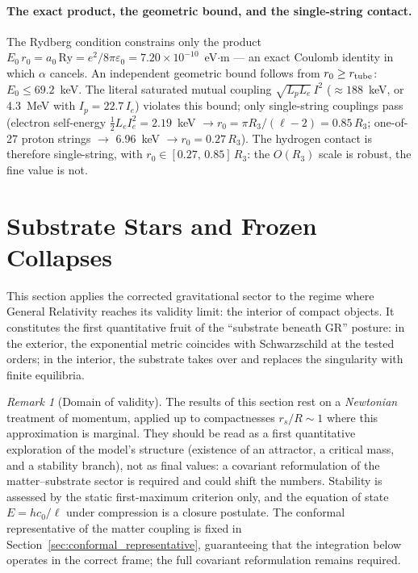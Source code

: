 \documentclass[11pt,a4paper]{article}
\theoremstyle{plain}
\theoremstyle{remark}
\newtheorem*{remarkstar}{Remark}
\begin{document}
\paragraph{The exact product, the geometric bound, and the single-string contact.} The Rydberg condition constrains only the product $E_0\,r_0 = a_0\,\mathrm{Ry} = e^2/8\pi\varepsilon_0 = 7.20\times10^{-10}$~eV$\cdot$m --- an exact Coulomb identity in which $\alpha$ cancels. An independent geometric bound follows from $r_0 \ge r_{\rm tube}$: $E_0 \le 69.2$~keV. The literal saturated mutual coupling $\sqrt{L_pL_e}\,I^2$ ($\approx 188$~keV, or 4.3~MeV with $I_p = 22.7\,I_e$) violates this bound; only single-string couplings pass (electron self-energy $\tfrac{1}{2}L_eI_e^2 = 2.19$~keV $\to r_0 = \pi R_3/(\ell-2) = 0.85\,R_3$; one-of-27 proton strings $\to$ 6.96~keV $\to r_0 = 0.27\,R_3$). The hydrogen contact is therefore single-string, with $r_0 \in [0.27,\,0.85]\,R_3$: the $O(R_3)$ scale is robust, the fine value is not.

\section{Substrate Stars and Frozen Collapses}
\label{sec:substrate_stars}

This section applies the corrected gravitational sector to the regime where General Relativity reaches its validity limit: the interior of compact objects. It constitutes the first quantitative fruit of the ``substrate beneath GR'' posture: in the exterior, the exponential metric coincides with Schwarzschild at the tested orders; in the interior, the substrate takes over and replaces the singularity with finite equilibria.

\begin{remarkstar}[Domain of validity]
The results of this section rest on a \emph{Newtonian} treatment of momentum, applied up to compactnesses $r_s/R \sim 1$ where this approximation is marginal. They should be read as a first quantitative exploration of the model's structure (existence of an attractor, a critical mass, and a stability branch), not as final values: a covariant reformulation of the matter--substrate sector is required and could shift the numbers. Stability is assessed by the static first-maximum criterion only, and the equation of state $E = hc_0/\ell$ under compression is a closure postulate. The conformal representative of the matter coupling is fixed in Section~\ref{sec:conformal_representative}, guaranteeing that the integration below operates in the correct frame; the full covariant reformulation remains required.
\end{remarkstar}
\end{document}
